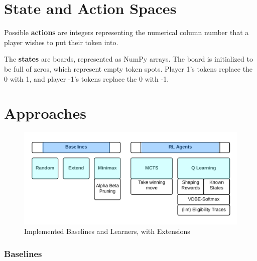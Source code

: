 \documentclass[12pt]{article}
\begin{document}
\section{State and Action Spaces}

Possible \textbf{actions} are integers representing the numerical column number that a player wishes to put their token into.

The \textbf{states} are boards, represented as NumPy arrays. The board is initialized to be full of zeros, which represent empty token spots. Player 1's tokens replace the 0 with 1, and player -1's tokens replace the 0 with -1. 

\section{Approaches}

\begin{figure}
\centering
\includegraphics[scale=.5]{learners.png}
\caption{Implemented Baselines and Learners, with Extensions}
\end{figure}

\subsubsection{Baselines} 
\end{document}
